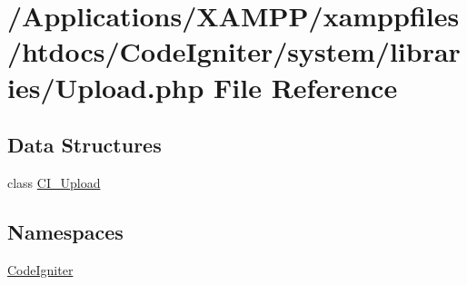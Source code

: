 \hypertarget{_upload_8php}{}\section{/\+Applications/\+X\+A\+M\+P\+P/xamppfiles/htdocs/\+Code\+Igniter/system/libraries/\+Upload.php File Reference}
\label{_upload_8php}
\subsection*{Data Structures}
\begin{DoxyCompactItemize}
\item 
class \mbox{\hyperlink{class_c_i___upload}{C\+I\+\_\+\+Upload}}
\end{DoxyCompactItemize}
\subsection*{Namespaces}
\begin{DoxyCompactItemize}
\item 
 \mbox{\hyperlink{namespace_code_igniter}{Code\+Igniter}}
\end{DoxyCompactItemize}
